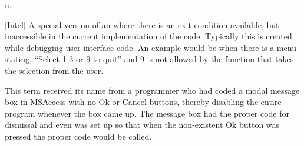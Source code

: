 n.

[Intel] A special version of an  where there is an exit condition available, but inaccessible in the current
implementation of the code. Typically this is created while debugging user interface code. An example would be when there is a menu stating,
``Select 1-3 or 9 to quit'' and 9 is not allowed by the function that takes the selection from the user.

This term received its name from a programmer who had coded a modal message box in MSAccess with no Ok or Cancel buttons, thereby disabling
the entire program whenever the box came up. The message box had the proper code for dismissal and even was set up so that when the
non-existent Ok button was pressed the proper code would be called.

